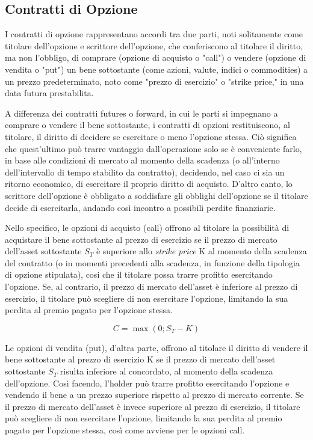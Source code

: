 \documentclass[12pt,a4paper]{report}
\begin{document}
\subsection{Contratti di Opzione}

I contratti di opzione rappresentano accordi tra due parti, noti solitamente come titolare dell'opzione e scrittore dell'opzione, che conferiscono al titolare il diritto, ma non l'obbligo, di comprare (opzione di acquisto o "call") o vendere (opzione di vendita o "put") un bene sottostante (come azioni, valute, indici o commodities) a un prezzo predeterminato, noto come "prezzo di esercizio" o "strike price," in una data futura prestabilita.

A differenza dei contratti futures o forward, in cui le parti si impegnano a comprare o vendere il bene sottostante, i contratti di opzioni restituiscono, al titolare, il diritto di decidere se esercitare o meno l'opzione stessa. Ciò significa che quest'ultimo può trarre vantaggio dall'operazione solo se è conveniente farlo, in base alle condizioni di mercato al momento della scadenza (o all'interno dell'intervallo di tempo stabilito da contratto), decidendo, nel caso ci sia un ritorno economico, di esercitare il proprio diritto di acquisto. D'altro canto, lo scrittore dell'opzione è obbligato a soddisfare gli obblighi dell'opzione se il titolare decide di esercitarla, andando così incontro a possibili perdite finanziarie.

Nello specifico, le opzioni di acquisto (call) offrono al titolare la possibilità di acquistare il bene sottostante al prezzo di esercizio se il prezzo di mercato dell'asset sottostante $S_T$ è superiore allo \textit{strike price} K al momento della scadenza del contratto (o in momenti precedenti alla scadenza, in funzione della tipologia di opzione stipulata), cosi che il titolare possa trarre profitto esercitando l'opzione. Se, al contrario, il prezzo di mercato dell'asset è inferiore al prezzo di esercizio, il titolare può scegliere di non esercitare l'opzione, limitando la sua perdita al premio pagato per l'opzione stessa. 

\begin{equation}
    C = \max (0; S_T - K)
\end{equation}

Le opzioni di vendita (put), d'altra parte, offrono al titolare il diritto di vendere il bene sottostante al prezzo di esercizio K se il prezzo di mercato dell'asset sottostante $S_T$ risulta inferiore al concordato, al momento della scadenza dell'opzione. Così facendo, l'holder può trarre profitto esercitando l'opzione e vendendo il bene a un prezzo superiore rispetto al prezzo di mercato corrente. Se il prezzo di mercato dell'asset è invece superiore al prezzo di esercizio, il titolare può scegliere di non esercitare l'opzione, limitando la sua perdita al premio pagato per l'opzione stessa, così come avviene per le opzioni call.
\end{document}
